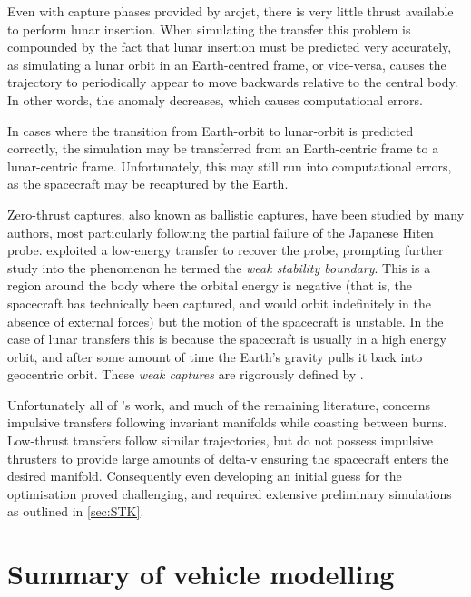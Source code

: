 Even with capture phases provided by arcjet, there is very little thrust available to perform lunar insertion. When simulating the transfer this problem is compounded by the fact that lunar insertion must be predicted very accurately, as simulating a lunar orbit in an Earth-centred frame, or vice-versa, causes the trajectory to periodically appear to move backwards relative to the central body. In other words, the anomaly decreases, which causes computational errors.

In cases where the transition from Earth-orbit to lunar-orbit is predicted correctly, the simulation may be transferred from an Earth-centric frame to a lunar-centric frame. Unfortunately, this may still run into computational errors, as the spacecraft may be recaptured by the Earth.

Zero-thrust captures, also known as ballistic captures, have been studied by many authors, most particularly \textcite{Belbruno1993} following the partial failure of the Japanese Hiten probe. \citeauthor{Belbruno2004} exploited a low-energy transfer to recover the probe, prompting further study into the phenomenon he termed the \emph{weak stability boundary}. This is a region around the body where the orbital energy is negative (that is, the spacecraft has technically been captured, and would orbit indefinitely in the absence of external forces) but the motion of the spacecraft is unstable. In the case of lunar transfers this is because the spacecraft is usually in a high energy orbit, and after some amount of time the Earth's gravity pulls it back into geocentric orbit. These \emph{weak captures} are rigorously defined by \textcite{Belbruno2004}.

Unfortunately all of \citeauthor{Belbruno2004}'s work, and much of the remaining literature, concerns impulsive transfers following invariant manifolds while coasting between burns. Low-thrust transfers follow similar trajectories, but do not possess impulsive thrusters to provide large amounts of delta-v ensuring the spacecraft enters the desired manifold. Consequently even developing an initial guess for the optimisation proved challenging, and required extensive preliminary simulations as outlined in \autoref{sec:STK}.

 

\section{Summary of vehicle modelling} \label{sec:Summary-vehicle}

